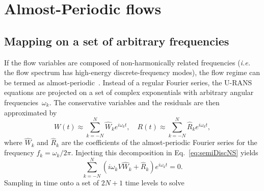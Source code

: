 \section{Almost-Periodic flows} %
\label{sec:almost_periodic_flows}

\subsection{Mapping on a set of arbitrary frequencies}
\label{sec:mapping-an-arbitrary}

If the flow variables are composed of non-harmonically related
frequencies (\emph{i.e.} the flow spectrum has high-energy
discrete-frequency modes), the flow regime can be termed as
almost-periodic~\cite{Besicovitch:1954qy}. Instead of a regular
Fourier series, the U-RANS equations are projected on a set of
complex exponentials with arbitrary angular frequencies~$\omega_k$.
The conservative variables and the residuals are then approximated by
\begin{equation}
   W(t) \approx \sum_{k=-N}^{N} \widehat{W}_k e^{i \omega_k t},\quad
   R(t) \approx \sum_{k=-N}^{N} \widehat{R}_k e^{i \omega_k t},
   \label{eq:fourierW}
\end{equation}
where $\widehat{W}_k$ and $\widehat{R}_k$ are the coefficients of the
almost-periodic Fourier series for the frequency $f_k = \omega_k/2\pi$.
Injecting this decomposition in Eq.~\eqref{eq:semiDiscNS} yields
\begin{equation}
    \sum_{k=-N}^{N} \left(i \omega_k V \widehat{W}_k + \widehat{R}_k
    \right) e^{i \omega_k t} =0.
   \label{eq:fourierNS_2}
\end{equation}
Sampling in time onto a set of $2 N + 1$ time levels to solve
